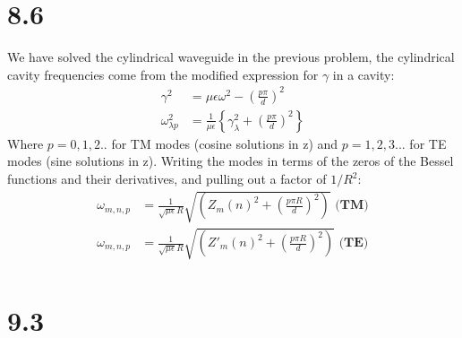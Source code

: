\documentclass[a4paper,11pt]{article}
\numberwithin{equation}{section}
\newcommand{\lrp}[1]{\left({#1}\right)}
\newcommand{\lrb}[1]{\left\{{#1}\right\}}
\begin{document}
\section*{8.6}
We have solved the cylindrical waveguide in the previous problem, the cylindrical cavity frequencies come from the modified expression for $\gamma$ in a cavity:
\begin{align}
 \gamma^2 &= \mu\epsilon\omega^2 - \lrp{\frac{p\pi}{d}}^2\\
 \omega^2_{\lambda p} &= \frac{1}{\mu\epsilon}\lrb{\gamma_\lambda^2+\lrp{\frac{p\pi}{d}}^2}
\end{align}
Where $p=0,1,2..$ for TM modes (cosine solutions in z) and $p=1,2,3...$ for TE modes (sine solutions in z).
Writing the modes in terms of the zeros of the Bessel functions and their derivatives, and pulling out a factor of $1/R^2$:
\begin{align}
 \omega_{m,n,p} &= \frac{1}{\sqrt{\mu\epsilon}R}\sqrt{\lrp{Z_m(n)^2+\lrp{\frac{p\pi R}{d}}^2}}\textbf{ (TM)}\\
 \omega_{m,n,p} &= \frac{1}{\sqrt{\mu\epsilon}R}\sqrt{\lrp{Z'_m(n)^2+\lrp{\frac{p\pi R}{d}}^2}}\textbf{ (TE)}\\
\end{align}



\section*{9.3}
\end{document}

